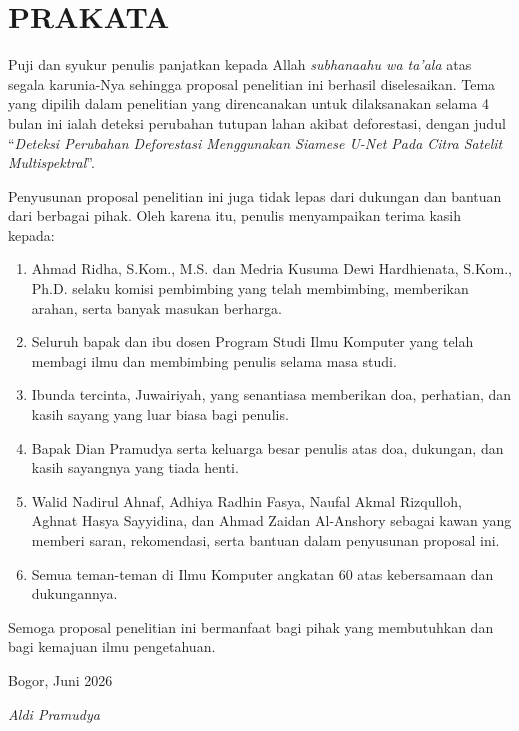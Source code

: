 
\chapter*{PRAKATA}

Puji dan syukur penulis panjatkan kepada Allah \textit{subhanaahu wa ta'ala}
atas segala karunia-Nya sehingga proposal penelitian ini berhasil diselesaikan.
Tema yang dipilih dalam penelitian yang direncanakan untuk dilaksanakan selama 4 bulan ini ialah deteksi perubahan tutupan lahan akibat deforestasi, dengan judul
``\textit{Deteksi Perubahan Deforestasi Menggunakan Siamese U-Net Pada Citra Satelit Multispektral}''.

Penyusunan proposal penelitian ini juga tidak lepas dari dukungan dan bantuan dari
berbagai pihak. Oleh karena itu, penulis menyampaikan terima kasih kepada:
\begin{enumerate}[label=\arabic*., leftmargin=2em, itemsep=0.1em]
  \item Ahmad Ridha, S.Kom., M.S. dan Medria Kusuma Dewi Hardhienata, S.Kom., Ph.D. selaku komisi pembimbing yang telah membimbing, memberikan arahan, serta banyak masukan berharga.
  \item Seluruh bapak dan ibu dosen Program Studi Ilmu Komputer yang telah membagi ilmu dan membimbing penulis selama masa studi.
  \item Ibunda tercinta, Juwairiyah, yang senantiasa memberikan doa, perhatian, dan kasih sayang yang luar biasa bagi penulis.
  \item Bapak Dian Pramudya serta keluarga besar penulis atas doa, dukungan, dan kasih sayangnya yang tiada henti. 
  \item Walid Nadirul Ahnaf, Adhiya Radhin Fasya, Naufal Akmal Rizqulloh, Aghnat Hasya Sayyidina, dan Ahmad Zaidan Al-Anshory sebagai kawan yang memberi saran, rekomendasi, serta bantuan dalam penyusunan proposal ini.
  \item Semua teman-teman di Ilmu Komputer angkatan 60 atas kebersamaan dan dukungannya.
\end{enumerate}

Semoga proposal penelitian ini bermanfaat bagi pihak yang membutuhkan dan bagi
kemajuan ilmu pengetahuan.

\vspace{1.5cm}

\noindent
Bogor, Juni 2026

\vspace{1.5cm}

\noindent
\textit{Aldi Pramudya}

